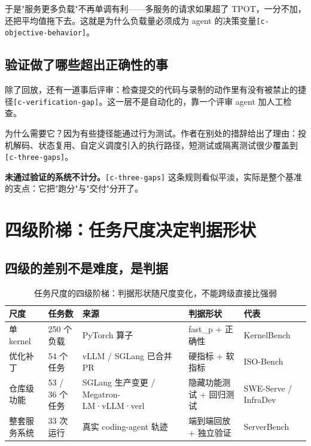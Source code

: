 于是"服务更多负载"不再单调有利——多服务的请求如果超了 TPOT，一分不加，还把平均值拖下去。这就是为什么负载量必须成为 agent 的决策变量{\scriptsize\texttt{[c-\hspace{0pt}objective-\hspace{0pt}behavior]}}。


\subsection{验证做了哪些超出正确性的事}

除了回放，还有一道事后评审：检查提交的代码与录制的动作里有没有被禁止的捷径{\scriptsize\texttt{[c-\hspace{0pt}verification-\hspace{0pt}gap]}}。这一层不是自动化的，靠一个评审 agent 加人工检查。


为什么需要它？因为有些捷径能通过行为测试。作者在别处的措辞给出了理由：投机解码、状态复用、自定义调度引入的执行路径，短测试或隔离测试很少覆盖到{\scriptsize\texttt{[c-\hspace{0pt}three-\hspace{0pt}gaps]}}。


\textbf{未通过验证的系统不计分。}{\scriptsize\texttt{[c-\hspace{0pt}three-\hspace{0pt}gaps]}} 这条规则看似平淡，实际是整个基准的支点：它把"跑分"与"交付"分开了。


\section{四级阶梯：任务尺度决定判据形状}

\subsection{四级的差别不是难度，是判据}

\begin{table}[t]
\centering
\footnotesize
\setlength{\tabcolsep}{4pt}
\caption{任务尺度的四级阶梯：判据形状随尺度变化，不能跨级直接比强弱}
\label{tab:2}
\begin{tabularx}{\textwidth}{llXll}
\toprule
尺度 & 任务数 & 来源 & 判据形状 & 代表 \\
\midrule
单 kernel & 250 个负载 & PyTorch 算子 & fast\_p + 正确性 & KernelBench \\
优化补丁 & 54 个任务 & vLLM / SGLang 已合并 PR & 硬指标 + 软指标 & ISO-Bench \\
仓库级功能 & 53 / 36 个任务 & SGLang 生产变更 / Megatron-LM·vLLM·verl & 隐藏功能测试 + 回归测试 & SWE-Serve / InfraDev \\
整套服务系统 & 33 次运行 & 真实 coding-agent 轨迹 & 端到端回放 + 独立验证 & ServerBench \\
\bottomrule
\end{tabularx}
\end{table}

